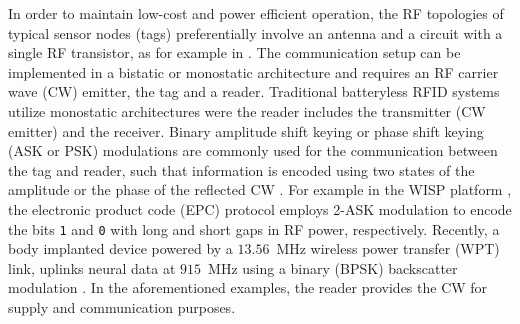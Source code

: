 \documentclass[journal]{IEEEtran}
\begin{document}
In order to maintain low-cost and power efficient operation, the RF topologies of typical sensor nodes (tags) preferentially involve an antenna and a circuit with a single RF transistor, as for example in \cite{daskalakis2014soil}. 
%
The communication setup can be implemented in a bistatic or monostatic architecture  and requires an RF carrier wave (CW) emitter, the tag  and a reader.  
%
Traditional batteryless RFID systems utilize monostatic architectures were the reader includes the transmitter (CW emitter) and the receiver.
% 
Binary  amplitude shift keying or phase shift keying (ASK or PSK) modulations are commonly used for the communication between the tag and reader, such that information is encoded using two states of the amplitude or the phase of the reflected CW \cite{daskalakis2018uw}.
%
For example in the WISP platform \cite{sample2008design}, the electronic product code (EPC) protocol employs 2-ASK modulation to encode the  bits \texttt{1} and \texttt{0}  with long and short gaps in RF power, respectively.
%
Recently,  a body  implanted device  powered by a $13.56$~MHz wireless power transfer (WPT) link,  uplinks neural  data at $915$~MHz using a binary (BPSK) backscatter modulation \cite{kampianakis2017dual}.
%
In the aforementioned examples, the reader provides the CW  for supply and communication purposes. 
\end{document}
